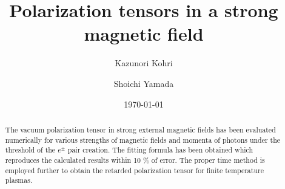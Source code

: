 
\def\mev{\,{\rm MeV}}
\def\gev{\,{\rm GeV}}
\def\tev{\,{\rm TeV}}
\def\sec{\,{\rm sec}}
\def\nat{\,{Nature }}
\def\apj{\,{Astrophys. J. }}
\def\mnras{\,{Mon. Not. R. Astron. Soc. }}
\def\aap{\,{Astron. Astrophys. }}
\def\pr{\,{Phys. Rev. }}
\def\prd{\,{Phys. Rev. D }}
\def\apjs{\,{Astrophys. J. Suppl. Ser.}}
\def\araa{\,{Ann. Rev. Astron. Astrophys. }}
\def\apjl{\,{Astrophys. J. Lett. }}
\def\ptp{\,{Prog. Theor. Phys. }}


\newcommand{\kpara}{k_{\parallel}}
\newcommand{\kperp}{k_{\perp}}
\newcommand{\me}{m_e}
\newcommand{\order}[1]{{\cal O}(#1)}
\newcommand{\vect}[1]{\mbox{\boldmath $#1$}}



\tighten
\draft



\title{Polarization tensors in a strong magnetic field}
\author{Kazunori Kohri}
\address{Yukawa Institute for Theoretical Physics, Kyoto University,
Kyoto, 606-8502, Japan}
\author{Shoichi Yamada}
\address{Institute of Laser Engineering (ILE), 
Osaka University, Osaka 565-0871,
Japan}
\date{\today}

\maketitle

\begin{abstract}
The vacuum polarization tensor in strong external magnetic
fields has been evaluated numerically for various strengths of
magnetic fields and momenta of photons under the threshold of 
the $e^{\pm}$ pair creation. The fitting formula has been obtained 
which reproduces the calculated results within 10 \% of error. 
The proper time method is employed further to obtain the retarded 
polarization tensor for finite temperature plasmas.
\end{abstract}

